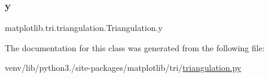 \mbox{\label{classmatplotlib_1_1tri_1_1triangulation_1_1Triangulation_aff84cb603026d3c8301491543810b8e5}} 
\subsubsection{\texorpdfstring{y}{y}}
{\footnotesize\ttfamily matplotlib.\+tri.\+triangulation.\+Triangulation.\+y}



The documentation for this class was generated from the following file\+:\begin{DoxyCompactItemize}
\item 
venv/lib/python3./site-\/packages/matplotlib/tri/\hyperlink{triangulation_8py}{triangulation.\+py}\end{DoxyCompactItemize}

